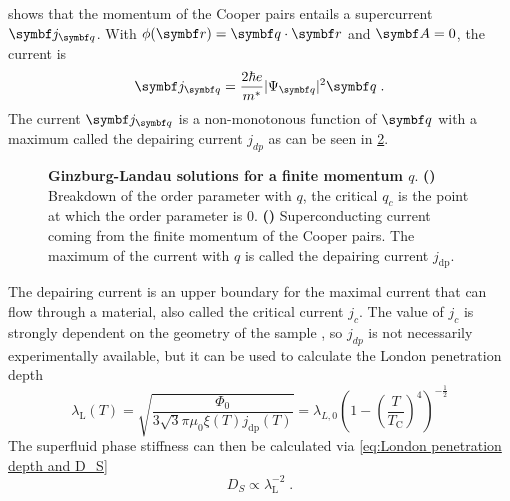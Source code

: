 \documentclass[../notes.tex]{subfiles}
\begin{document}
 shows that the momentum of the Cooper pairs entails a supercurrent \(\vb{j}_{\vb{q}}\).
With \(\phi(\vb{r}) = \vb{q} \cdot \vb{r}\) and \(\vb{A} = 0\), the current is
\begin{equation}
	\vb{j}_{\vb{q}} = \frac{2 \hbar e}{m^*} \vert \Psi_{\vb{q}} \vert^2 \vb{q} \;.
\end{equation}
The current \(\vb{j}_{\vb{q}}\) is a non-monotonous function of \(\vb{q}\) with a maximum called the depairing current \(j_{dp}\) as can be seen in \cref{sfig:Ginzburg Landau current vs q}.
\begin{figure}[t]
	\centering
	\begin{subfigure}[b]{0.49\textwidth}
		\centering
		\caption{\hfill\null}\label{sfig:Ginzburg Landau OP vs q}
		
	\end{subfigure}%
	\begin{subfigure}[b]{0.49\textwidth}
		\centering
		\caption{\hfill\null}\label{sfig:Ginzburg Landau current vs q}
		
	\end{subfigure}
	\caption{\textbf{Ginzburg-Landau solutions for a finite momentum \(q\)}. \textbf{()} Breakdown of the order parameter with \(q\), the critical \(q_c\) is the point at which the order parameter is 0. \textbf{()} Superconducting current coming from the finite momentum of the Cooper pairs. The maximum of the current with \(q\) is called the depairing current \(j_{\mathrm{dp}}\).}
	\label{fig:Ginzburg Landau OP and current vs q}
\end{figure}
The depairing current is an upper boundary for the maximal current that can flow through a material, also called the critical current \(j_c\).
The value of \(j_c\) is strongly dependent on the geometry of the sample \cite{bardeenCriticalFieldsCurrents1962, xuAchievingTheoreticalDepairing2010}, so \(j_{dp}\) is not necessarily experimentally available, but it can be used to calculate the London penetration depth \cite{tinkhamIntroductionSuperconductivity1996}
\begin{equation}
	\lambda_{\mathrm{L}} (T) = \sqrt{\frac{\Phi_0}{3 \sqrt{3} \pi \mu_0 \xi(T) j_{\mathrm{dp}} (T)}} = \lambda_{L,0} \left( 1 - \left( \frac{T}{T_{\mathrm{C}}}\right)^4 \right)^{-\frac{1}{2}} 
\end{equation}
The superfluid phase stiffness can then be calculated via \cref{eq:London penetration depth and D_S}
\begin{equation}
	D_S \propto \lambda_{\mathrm{L}}^{-2} \;.
\end{equation}
\end{document}
